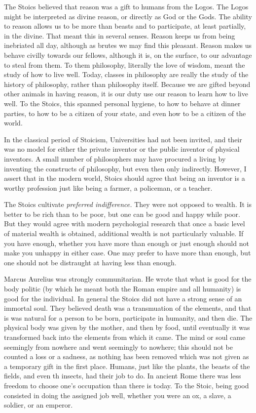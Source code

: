 \documentclass[
	fontsize=10pt, %
	twoside=false, %
	secnumdepth=1, %
]{kaobook}
\begin{document}
The Stoics believed that reason was a gift to humans from the Logos.
The Logos might be interpreted as divine reason, or directly
as God or the Gods.
The ability to reason allows us to be more than beasts
and to participate, at least partially, in the divine.
That meant this in several senses.
Reason keeps us from being inebriated
all day, although as brutes we may find this pleasant.
Reason makes us behave civilly towards our
fellows, although it is, on the surface, to our advantage
to steal from them.
To them philosophy, literally the love of wisdom,
meant the study of how to live well.
Today, classes in philosophy are really the study
of the history of philosophy, rather than philosophy itself.
Because we are gifted beyond other animals in having
reason, it is our duty use our reason to learn how to live
well.
To the Stoics, this spanned personal hygiene,
to how to behave at dinner parties, to how to be a citizen
of your state, and even how to be a citizen of the world.

In the classical period of Stoicism, Universities had
not been invited, and their was no model for either
the private inventor or the public inventor of physical
inventors.
A small number of philosophers may have procured a
living by inventing the constructs of philosophy, but
even then only indirectly.
However, I assert that in the modern world, Stoics
should agree that being an inventor is a worthy profession
just like being a farmer, a policeman, or a teacher.

The Stoics cultivate {\em preferred indifference.}
They were not opposed to wealth.
It is better to be rich than to be poor,
but one can be good and happy while poor.
But they would agree with modern psychologial research
that once a basic level of material wealth is obtained,
additional wealth is not particularly valuable.
If you have enough, whether you have more than enough
or just enough should not make you unhappy in either case.
One may prefer to have more than enough, but one should
not be distraught at having less than enough.

Marcus Aurelius was strongly communitarian.
He wrote that what is good for the body politic (by which
he meant both the Roman empire and all humanity) is good
for the individual.
In general the Stoics did not have a strong sense of
an immortal soul.
They believed death was a transmuation of the elements,
and that is was natural for a person to be born, participate
in humanity, and then die.
The physical body was given by the mother, and
then by food, until eventually it was transformed back into
the elements from which it came.
The mind or soul came seemingly from nowhere and went
seemingly to nowhere; this should not be counted a loss
or a sadness, as nothing has been removed which was not
given as a temporary gift in the first place.
Humans, just like the plants, the beasts of the fields,
and even th insects, had their job to do.
In ancient Rome there was less freedom to choose
one's occupation than there is today.
To the Stoic, being good consisted in doing the assigned job
well, whether you were an ox, a slave, a soldier, or an emperor.
\end{document}
